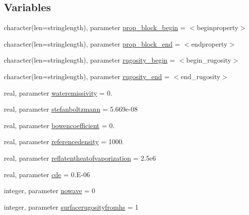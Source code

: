 \subsection*{Variables}
\begin{DoxyCompactItemize}
\item 
character(len=stringlength), parameter \mbox{\hyperlink{namespacemoduleinterfacewaterair_a5b4bd7da5a9e3e4da1bfe7edd8b805ac}{prop\+\_\+block\+\_\+begin}} = \textquotesingle{}$<$beginproperty$>$\textquotesingle{}
\item 
character(len=stringlength), parameter \mbox{\hyperlink{namespacemoduleinterfacewaterair_abb372346805a352ba54048bced113782}{prop\+\_\+block\+\_\+end}} = \textquotesingle{}$<$endproperty$>$\textquotesingle{}
\item 
character(len=stringlength), parameter \mbox{\hyperlink{namespacemoduleinterfacewaterair_a0278d4530d0ebedf0d59117a3c772f93}{rugosity\+\_\+begin}} = \textquotesingle{}$<$begin\+\_\+rugosity$>$\textquotesingle{}
\item 
character(len=stringlength), parameter \mbox{\hyperlink{namespacemoduleinterfacewaterair_a58a4130456c2f79f5500a5ccb4517cfd}{rugosity\+\_\+end}} = \textquotesingle{}$<$end\+\_\+rugosity$>$\textquotesingle{}
\item 
real, parameter \mbox{\hyperlink{namespacemoduleinterfacewaterair_af9d25ee72bf87831a84be25bc8435c55}{wateremissivity}} = 0.
\item 
real, parameter \mbox{\hyperlink{namespacemoduleinterfacewaterair_a4c926bc0f796609398890a390dc9d36c}{stefanboltzmann}} = 5.\+669e-\/08
\item 
real, parameter \mbox{\hyperlink{namespacemoduleinterfacewaterair_a8155eb359d8312366017041e27b20e8b}{bowencoefficient}} = 0.
\item 
real, parameter \mbox{\hyperlink{namespacemoduleinterfacewaterair_a65185c3b0a782bd2b12e894ee2619550}{referencedensity}} = 1000.
\item 
real, parameter \mbox{\hyperlink{namespacemoduleinterfacewaterair_a56a7408ea5d0be55c3bed3cda2294990}{reflatentheatofvaporization}} = 2.\+5e6
\item 
real, parameter \mbox{\hyperlink{namespacemoduleinterfacewaterair_ac4e6928da233e97fced767b3ff6b8482}{cde}} = 0.\+E-\/06
\item 
integer, parameter \mbox{\hyperlink{namespacemoduleinterfacewaterair_a9e6fc9893e6a61442860c5361e65ef24}{nowave}} = 0
\item 
integer, parameter \mbox{\hyperlink{namespacemoduleinterfacewaterair_a48f8ac61c3aadc9ee602467e19d9939a}{surfacerugosityfromhs}} = 1

\end{DoxyCompactItemize}
